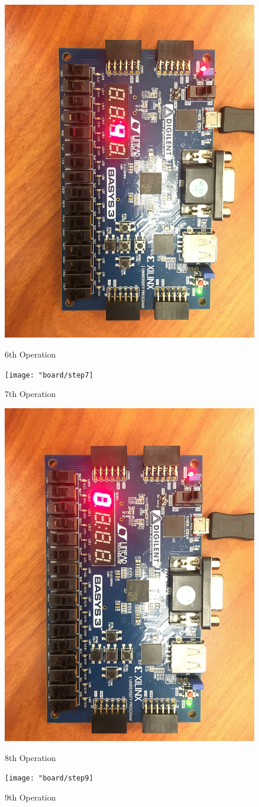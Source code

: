 \documentclass[11pt]{article}
\begin{document}
\begin{figure}[ht]
	\centering
	\includegraphics[width=12cm]{"board/step6"}
	\caption{6th Operation}
	\texttt{[image: "board/step7]}
	\caption{7th Operation}
\end{figure}
\begin{figure}[ht]
	\centering
	\includegraphics[width=12cm]{"board/step8"}
	\caption{8th Operation}
	\texttt{[image: "board/step9]}
	\caption{9th Operation}
\end{figure}
\end{document}
